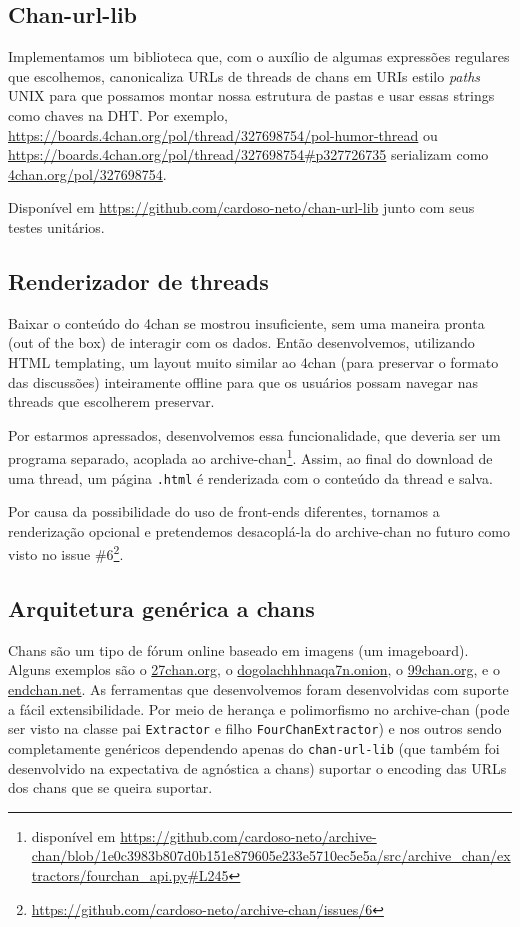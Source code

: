 \subsection{Chan-url-lib}

Implementamos um biblioteca que, com o auxílio de algumas expressões regulares que escolhemos, canonicaliza URLs de threads de chans em URIs estilo \textit{paths} UNIX para que possamos montar nossa estrutura de pastas e usar essas strings como chaves na DHT.
Por exemplo, \url{https://boards.4chan.org/pol/thread/327698754/pol-humor-thread} ou \url{https://boards.4chan.org/pol/thread/327698754#p327726735} serializam como \url{4chan.org/pol/327698754}.

Disponível em \url{https://github.com/cardoso-neto/chan-url-lib} junto com seus testes unitários.

\subsection{Renderizador de threads}

Baixar o conteúdo do 4chan se mostrou insuficiente, sem uma maneira pronta (out of the box) de interagir com os dados.
Então desenvolvemos, utilizando HTML templating, um layout muito similar ao 4chan (para preservar o formato das discussões) inteiramente offline para que os usuários possam navegar nas threads que escolherem preservar.

Por estarmos apressados, desenvolvemos essa funcionalidade, que deveria ser um programa separado, acoplada ao archive-chan\footnote{disponível em \url{https://github.com/cardoso-neto/archive-chan/blob/1e0c3983b807d0b151e879605e233e5710ec5e5a/src/archive_chan/extractors/fourchan_api.py#L245}}.
Assim, ao final do download de uma thread, um página \texttt{.html} é renderizada com o conteúdo da thread e salva.

Por causa da possibilidade do uso de front-ends diferentes, tornamos a renderização opcional e pretendemos desacoplá-la do archive-chan no futuro como visto no issue \#6\footnote{\url{https://github.com/cardoso-neto/archive-chan/issues/6}}.

\subsection{Arquitetura genérica a chans}

Chans são um tipo de fórum online baseado em imagens (um imageboard).
Alguns exemplos são o \url{27chan.org}, o \url{dogolachhhnaqa7n.onion}, o \url{99chan.org}, e o \url{endchan.net}. 
As ferramentas que desenvolvemos foram desenvolvidas com suporte a fácil extensibilidade.
Por meio de herança e polimorfismo no archive-chan (pode ser visto na classe pai \texttt{Extractor} e filho \texttt{FourChanExtractor}) e nos outros sendo completamente genéricos dependendo apenas do \texttt{chan-url-lib} (que também foi desenvolvido na expectativa de agnóstica a chans) suportar o encoding das URLs dos chans que se queira suportar.

